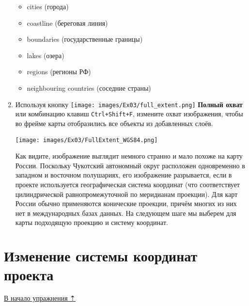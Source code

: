 \documentclass[
  12pt,
]{book}
\providecommand{\tightlist}{%
  \setlength{\itemsep}{0pt}\setlength{\parskip}{0pt}}
\begin{document}
\begin{enumerate}
  \begin{itemize}
  \tightlist
  \item
    cities (города)
  \item
    coastline (береговая линия)
  \item
    boundaries (государственные границы)
  \item
    lakes (озера)
  \item
    regions (регионы РФ)
  \item
    neighbouring countries (соседние страны)
  \end{itemize}
\item
  Используя кнопку \texttt{[image: images/Ex03/full\_extent.png]} \textbf{Полный охват} или комбинацию клавиш \texttt{Ctrl+Shift+F}, измените охват изображения, чтобы во фрейме карты отобразились все объекты из добавленных слоёв.

  \texttt{[image: images/Ex03/FullExtent\_WGS84.png]}

  Как видите, изображение выглядит немного странно и мало похоже на карту России. Поскольку Чукотский автономный округ расположен одновременно в западном и восточном полушариях, его изображение разрывается, если в проекте используется географическая система координат (что соответствует цилиндрической равнопромежуточной по меридианам проекции). Для карт России обычно применяются конические проекции, причём многих из них нет в международных базах данных. На следующем шаге мы выберем для карты подходящую проекцию и систему координат.
\end{enumerate}

\hypertarget{map-design-population-change-crs}{%
\section{Изменение системы координат проекта}\label{map-design-population-change-crs}}

\protect\hyperlink{map-design-population}{В начало упражнения ⇡}
\end{document}
